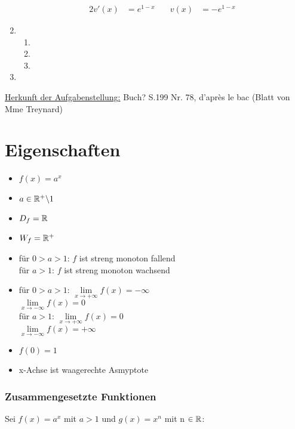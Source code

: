 \begin{Beweis}
\begin{enumerate}
\begin{minipage}{0.45\textwidth}
\begin{alignat*}{2}
v'(x)&=e^{1-x}\quad & v(x)&=-e^{1-x}
\end{alignat*}
\end{minipage}
\item%
\begin{enumerate}
\item%
\item%
\item%
\end{enumerate}
\item%
\end{enumerate}
\underline{Herkunft der Aufgabenstellung:} Buch? S.199 Nr. 78, d'après le bac (Blatt von Mme Treynard)
\end{Beweis}

\section{Eigenschaften}
		

\begin{itemize}
\item$f(x)=a^x$
\item$a\in\mathbb{R}^+\backslash 1$
\item$D_f=\mathbb{R}$
\item$W_f=\mathbb{R}^+$
\item für $0>a>1$: $f$ ist streng monoton fallend\\
für $a>1$: $f$ ist streng monoton wachsend
\item für $0>a>1$: $\lim\limits_{x\to +\infty}f(x)=-\infty$\\
			$\lim\limits_{x\to -\infty}f(x)=0$\\
für $a>1$: $\lim\limits_{x\to +\infty}f(x)=0$\\
	        $\lim\limits_{x\to -\infty}f(x)=+\infty$
\item $f(0)=1$
\item x-Achse ist waagerechte Asmyptote

\end{itemize}

\subsubsection{Zusammengesetzte Funktionen}

Sei $f(x)= a^x$ mit $a>1$ und $g(x)=x^n$ mit n $\in \mathbb{R}$:\\

